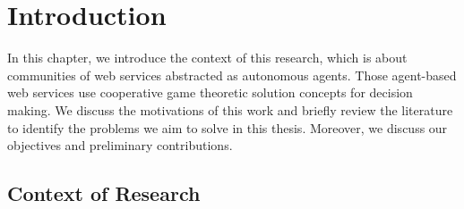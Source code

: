 \setcounter{chapter}{0}
\chapter{Introduction}\label{sec:intro}
In this chapter, we introduce the context of this research, which
is about communities of web services abstracted as autonomous
agents. Those agent-based web services use cooperative game
theoretic solution concepts for decision making. We discuss the
motivations of this work and briefly review the literature to
identify the problems we aim to solve in this thesis. Moreover, we
discuss our objectives and preliminary contributions.

\section{Context of Research}\label{sec:motivation}

